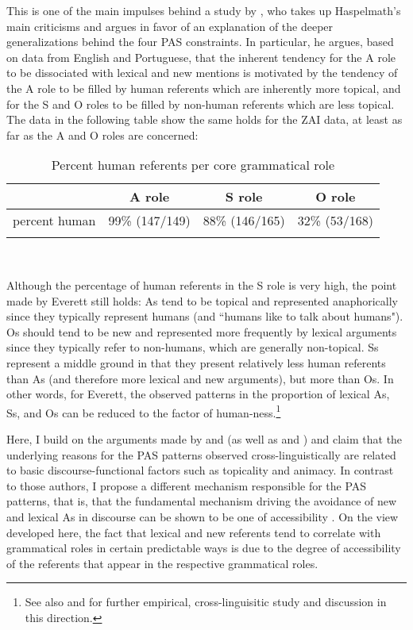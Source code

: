 This is one of the main impulses behind a study by \citet{everett2009}, who takes up Haspelmath's main criticisms and argues in favor of an explanation of the deeper generalizations behind the four PAS constraints. In particular, he argues, based on data from English and Portuguese, that the inherent tendency for the A role to be dissociated with lexical and new mentions is motivated by the tendency of the A role to be filled by human referents which are inherently more topical, and for the S and O roles to be filled by non-human referents which are less topical. The data in the following table show the same holds for the ZAI data, at least as far as the A and O roles are concerned:

\begin{table} 

\caption{{Percent human referents per core grammatical role}}
\begin{tabular}{| r  c  c  c }
\lsptoprule
 & A role & S role & O role\\

\midrule
percent human & 99{\%} (147/149) & 88{\%} (146/165) & 32{\%} (53/168)  \\
  
\lspbottomrule
\end{tabular}\\
\label{humandist}

\end{table}
Although the percentage of human referents in the S role is very high, the point made by Everett still holds: As tend to be topical and represented anaphorically since they typically represent humans (and ``humans like to talk about humans"). Os should tend to be new and represented more frequently by lexical arguments since they typically refer to non-humans, which are generally non-topical. Ss represent a middle ground in that they present relatively less human referents than As (and therefore more lexical and new arguments), but more than Os. In other words, for Everett, the observed patterns in the proportion of lexical As, Ss, and Os can be reduced to the factor of human-ness.\footnote{See also \citealt{haig2016} and \citealt{schnell2017} for further empirical, cross-linguisitic study and discussion in this direction.} 

Here, I build on the arguments made by \citet{haspelmath2006} and \citet{everett2009} (as well as \citealt{haig2016} and \citealt{schnell2017}) and claim that the underlying reasons for the PAS patterns observed cross-linguistically are related to basic discourse-functional factors such as topicality and animacy. In contrast to those authors, I propose a different mechanism responsible for the PAS patterns, that is, that the fundamental mechanism driving the avoidance of new and lexical As in discourse can be shown to be one of accessibility \citep{ariel1990,ariel2001}. On the view developed here, the fact that lexical and new referents tend to correlate with grammatical roles in certain predictable ways is due to the degree of accessibility of the referents that appear in the respective grammatical roles.

